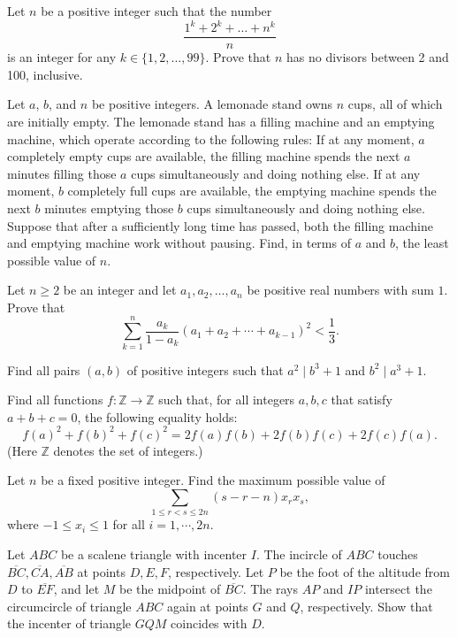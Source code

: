 \documentclass[11pt]{scrartcl}
\begin{document}
\begin{problem}[4306507392377162131]
Let $n$ be a positive integer such that the number
\[\frac{1^k + 2^k + \dots + n^k}{n}\]is an integer for any $k \in \{1, 2, \dots, 99\}$. Prove that $n$ has no divisors between 2 and 100, inclusive.
\end{problem}
\begin{problem}[869501852347427]
Let \(a\), \(b\), and \(n\) be positive integers. A lemonade stand owns \(n\) cups, all of which are initially empty. The lemonade stand has a filling machine and an emptying machine, which operate according to the following rules:
If at any moment, \(a\) completely empty cups are available, the filling machine spends the next \(a\) minutes filling those \(a\) cups simultaneously and doing nothing else.
If at any moment, \(b\) completely full cups are available, the emptying machine spends the next \(b\) minutes emptying those \(b\) cups simultaneously and doing nothing else.
Suppose that after a sufficiently long time has passed, both the filling machine and emptying machine work without pausing. Find, in terms of \(a\) and \(b\), the least possible value of \(n\).
\end{problem}
\begin{problem}[723258861624579]
Let $n\geq 2$ be an integer and let $a_1, a_2, \ldots, a_n$ be positive real numbers with sum $1$. Prove that$$\sum_{k=1}^n \frac{a_k}{1-a_k}(a_1+a_2+\cdots+a_{k-1})^2 < \frac{1}{3}.$$
\end{problem}
\begin{problem}[685299549954467]
Find all pairs $(a,b)$ of positive integers such that $a^2\mid b^3+1$ and $b^2\mid a^3+1$.
\end{problem}
\begin{problem}[6174780824971319633]
Find all functions $f:\mathbb Z\rightarrow \mathbb Z$ such that, for all integers $a,b,c$ that satisfy $a+b+c=0$, the following equality holds:
\[f(a)^2+f(b)^2+f(c)^2=2f(a)f(b)+2f(b)f(c)+2f(c)f(a).\]
(Here $\mathbb{Z}$ denotes the set of integers.)
\end{problem}
\begin{problem}[2350680529866748619]
Let $n$ be a fixed positive integer. Find the maximum possible value of\[ \sum_{1 \le r < s \le 2n} (s-r-n)x_rx_s, \]where $-1 \le x_i \le 1$ for all $i = 1, \cdots , 2n$.
\end{problem}
\begin{problem}[6322745101407512634]
Let $ABC$ be a scalene triangle with incenter $I$. The incircle of $ABC$ touches $\overline{BC},\overline{CA},\overline{AB}$ at points $D,E,F$, respectively. Let $P$ be the foot of the altitude from $D$ to $\overline{EF}$, and let $M$ be the midpoint of $\overline{BC}$. The rays $AP$ and $IP$ intersect the circumcircle of triangle $ABC$ again at points $G$ and $Q$, respectively. Show that the incenter of triangle $GQM$ coincides with $D$.
\end{problem}
\end{document}

